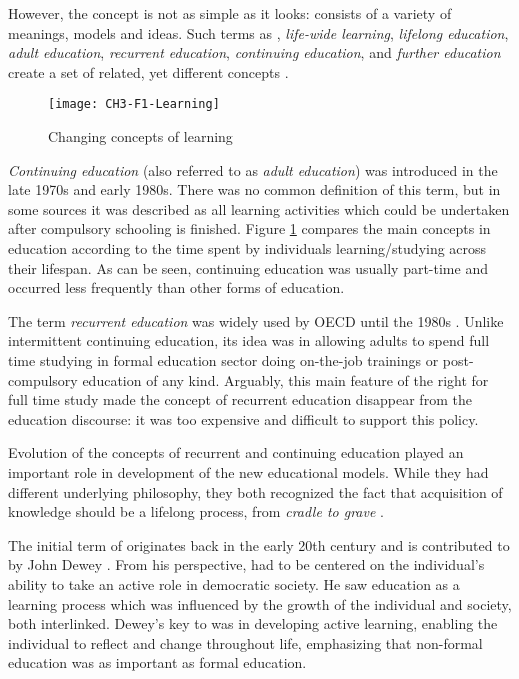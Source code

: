 
However, the concept is not as simple as it looks: \LLLs consists of a variety
of meanings, models and ideas. Such terms as \textit{\LLLsn}, \textit{life-wide
learning}, \textit{lifelong education}, \textit{adult education},
\textit{recurrent education}, \textit{continuing education}, and \textit{further
education} create a set of related, yet different concepts \citep{Hager2011}.

\begin{figure}[htb]
\centering
\texttt{[image: CH3-F1-Learning]}
\caption[Changing concepts of learning]{Changing concepts of learning 
\citep{Jarvis2004}}
\label{fig:learning}
\end{figure}

\textit{Continuing education} (also referred to as \textit{adult education}) was
introduced in the late 1970s and early 1980s. There was no common definition of
this term, but in some sources  \citep{Jarvis2004} it was described as all
learning activities which could be undertaken after compulsory schooling is
finished. Figure \ref{fig:learning} compares the main concepts in education
according to the time spent by individuals learning/studying across their
lifespan. As can be seen, continuing education was usually part-time and
occurred less frequently than other forms of education.

\FloatBarrier
The term \textit{recurrent education} was widely used by OECD until the 1980s
\citep{Jarvis2004}. Unlike intermittent continuing education, its idea was
in allowing adults to spend full time studying in formal education sector doing
on-the-job trainings or post-compulsory education of any kind. Arguably, this
main feature of the right for full time study made the concept of recurrent
education disappear from the education discourse: it was too expensive and
difficult to support this policy.

Evolution of the concepts of recurrent and continuing education played an
important role in development of the new educational models. While they had
different underlying philosophy, they both recognized the fact that acquisition
of knowledge should be a lifelong process, from \textit{cradle to grave}
\citep{Hargreaves2004}.

The initial term of \textit{\LLLsn} originates back in the early 20th century
and is contributed to by John Dewey \citeyearpar{Dewey2004}. From his
perspective, \LLLs had to be centered on the individual's ability to take an
active role in democratic society. He saw education as a learning process which
was influenced by the growth of the individual and society, both interlinked.
Dewey's key to \LLLs was in developing active learning, enabling the individual
to reflect and change throughout life, emphasizing that non-formal education was
as important as formal education.

